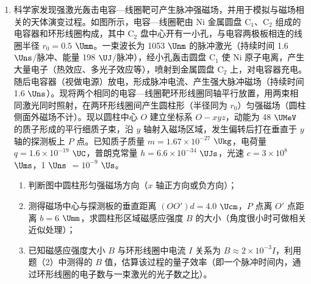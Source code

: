 \documentclass[\gkver]{gaokaozhenti}
\begin{document}
\begin{enumerate}
\item
科学家发现强激光轰击电容—线圈靶可产生脉冲强磁场，并用于模拟与磁场相关的天体演变过程。如图所示，电容—线圈靶由 Ni 金属圆盘 $\mathrm{C_{1}}$、$\mathrm{C_{2}}$ 组成的电容器和环形线圈构成，其中 $\mathrm{C_{2}}$ 盘中心开有一小孔，与电容两极板相连的线圈半径 $r_{0}=0.5$ $\Umm$。一束波长为 1053 $\Unm$ 的脉冲激光（持续时间 1.6 $\Uns$/脉冲、能量 198 $\UJ$/脉冲），经小孔轰击圆盘 $\mathrm{C_{1}}$ 使 Ni 原子电离，产生大量电子（热效应、多光子效应等），喷射到金属圆盘 $\mathrm{C_{2}}$ 上，对电容器充电。随后电容器（视做电源）放电，形成脉冲电流、产生强大脉冲磁场（持续时间 1.6 $\Uns$）。现将两个相同的电容—线圈靶环形线圈同轴平行放置，用两束相同激光同时照射，在两环形线圈间产生圆柱形（半径同为 $r_{0}$）匀强磁场（圆柱侧面外磁场不计）。现以圆柱中心 $O$ 建立坐标系 $O-xyz$，动能为 48 $\UMeV$ 的质子形成的平行细质子束，沿 $y$ 轴射入磁场区域，发生偏转后打在垂直于 $y$ 轴的探测板上 $P$ 点。已知质子质量 $m=1.67\times10^{-27}$ $\Ukg$，电荷量 $q=1.6\times10^{-19}$ $\UC$，普朗克常量 $h=6.6\times10^{-34}$ $\UJs$，光速 $c=3\times10^{8}$ $\Ums$，1 $\Uns$ $=10^{-9}$ $\Us$。
\begin{enumerate}
	\item
	判断图中圆柱形匀强磁场方向（$x$ 轴正方向或负方向）；
	\item
	测得磁场中心与探测板的垂直距离 $(OO')d=4.0$ $\Ucm$，$P$ 点离 $O'$ 点距离 $b=6$ $\Umm$，求圆柱形区域磁感应强度 $B$ 的大小（角度很小时可做相关近似处理）；
	\item
	已知磁感应强度大小 $B$ 与环形线圈中电流 $I$ 关系为 $B\approx2\times10^{-3}I$，利用题（2）中测得的 $B$ 值，估算该过程的量子效率（即一个脉冲时间内，通过环形线圈的电子数与一束激光的光子数之比）。
\end{enumerate}
\onepicture[align=right, w=6.6cm]{}
\end{enumerate}
\end{document}
